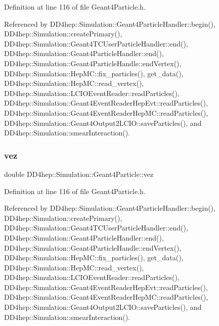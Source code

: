 Definition at line 116 of file Geant4\+Particle.\+h.



Referenced by D\+D4hep\+::\+Simulation\+::\+Geant4\+Particle\+Handler\+::begin(), D\+D4hep\+::\+Simulation\+::create\+Primary(), D\+D4hep\+::\+Simulation\+::\+Geant4\+T\+C\+User\+Particle\+Handler\+::end(), D\+D4hep\+::\+Simulation\+::\+Geant4\+Particle\+Handler\+::end(), D\+D4hep\+::\+Simulation\+::\+Geant4\+Particle\+Handle\+::end\+Vertex(), D\+D4hep\+::\+Simulation\+::\+Hep\+M\+C\+::fix\+\_\+particles(), get\+\_\+data(), D\+D4hep\+::\+Simulation\+::\+Hep\+M\+C\+::read\+\_\+vertex(), D\+D4hep\+::\+Simulation\+::\+L\+C\+I\+O\+Event\+Reader\+::read\+Particles(), D\+D4hep\+::\+Simulation\+::\+Geant4\+Event\+Reader\+Hep\+Evt\+::read\+Particles(), D\+D4hep\+::\+Simulation\+::\+Geant4\+Event\+Reader\+Hep\+M\+C\+::read\+Particles(), D\+D4hep\+::\+Simulation\+::\+Geant4\+Output2\+L\+C\+I\+O\+::save\+Particles(), and D\+D4hep\+::\+Simulation\+::smear\+Interaction().

\hypertarget{class_d_d4hep_1_1_simulation_1_1_geant4_particle_a63ac22451aea71547d69c407ae4824da}{}\label{class_d_d4hep_1_1_simulation_1_1_geant4_particle_a63ac22451aea71547d69c407ae4824da} 
\subsubsection{\texorpdfstring{vez}{vez}}
{\footnotesize\ttfamily double D\+D4hep\+::\+Simulation\+::\+Geant4\+Particle\+::vez}



Definition at line 116 of file Geant4\+Particle.\+h.



Referenced by D\+D4hep\+::\+Simulation\+::\+Geant4\+Particle\+Handler\+::begin(), D\+D4hep\+::\+Simulation\+::create\+Primary(), D\+D4hep\+::\+Simulation\+::\+Geant4\+T\+C\+User\+Particle\+Handler\+::end(), D\+D4hep\+::\+Simulation\+::\+Geant4\+Particle\+Handler\+::end(), D\+D4hep\+::\+Simulation\+::\+Geant4\+Particle\+Handle\+::end\+Vertex(), D\+D4hep\+::\+Simulation\+::\+Hep\+M\+C\+::fix\+\_\+particles(), get\+\_\+data(), D\+D4hep\+::\+Simulation\+::\+Hep\+M\+C\+::read\+\_\+vertex(), D\+D4hep\+::\+Simulation\+::\+L\+C\+I\+O\+Event\+Reader\+::read\+Particles(), D\+D4hep\+::\+Simulation\+::\+Geant4\+Event\+Reader\+Hep\+Evt\+::read\+Particles(), D\+D4hep\+::\+Simulation\+::\+Geant4\+Event\+Reader\+Hep\+M\+C\+::read\+Particles(), D\+D4hep\+::\+Simulation\+::\+Geant4\+Output2\+L\+C\+I\+O\+::save\+Particles(), and D\+D4hep\+::\+Simulation\+::smear\+Interaction().

